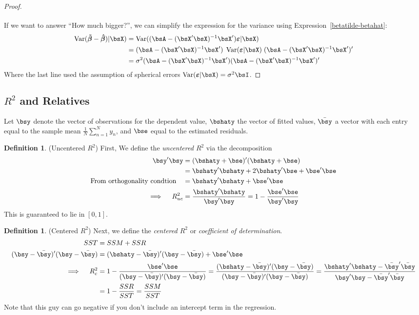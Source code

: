 \documentclass[12pt]{article}
\theoremstyle{plain}
\theoremstyle{definition}
\newtheorem{defn}[thm]{Definition}
\theoremstyle{remark}
\newcommand{\bsvarepsilon}{\boldsymbol{\varepsilon}}
\newcommand{\bshatbeta}{\boldsymbol{\hat{\beta}}}
\newcommand{\bstildebeta}{\boldsymbol{\tilde{\beta}}}
\newcommand{\Var}{\operatorname{Var}}
\newcommand{\sumnN}{\sum^N_{n=1}}
\begin{document}
\begin{proof}
\\
\\
If we want to answer ``How much bigger?'', we can simplify the
expression for the variance using Expression~\ref{betatilde-betahat}:
\begin{align*}
  \Var(\bstildebeta-\bshatbeta)|\bsX)
  &=
  \Var((\bsA-(\bsX'\bsX)^{-1}\bsX')\bsvarepsilon|\bsX) \\
  &=
  (\bsA-(\bsX'\bsX)^{-1}\bsX')
  \;\Var(\bsvarepsilon|\bsX)\;
  (\bsA-(\bsX'\bsX)^{-1}\bsX')' \\
  &=
  \sigma^2 (\bsA-(\bsX'\bsX)^{-1}\bsX')
  (\bsA-(\bsX'\bsX)^{-1}\bsX')'
\end{align*}
Where the last line used the assumption of spherical errors
$\Var(\bsvarepsilon|\bsX)=\sigma^2\bsI$.
\end{proof}


\clearpage
\subsection{$R^2$ and Relatives}

Let $\bsy$ denote the vector of observations for the dependent value,
$\bshaty$ the vector of fitted values, $\bar{\bsy}$ a vector with each
entry equal to the sample mean $\frac{1}{N}\sumnN y_n$, and $\bse$ equal
to the estimated residuals.

\begin{defn}(Uncentered $R^2$)
First, We define the \emph{uncentered $R^2$} via the decomposition
\begin{align*}
  \bsy' \bsy
  &=
  (\bshaty +\bse)'
  (\bshaty +\bse) \\
  &=
  \bshaty' \bshaty
  +2 \bshaty'\bse
  +\bse'\bse \\
  \text{From orthogonality condtion} \quad
  &=
  \bshaty' \bshaty
  +\bse'\bse \\
  \implies\quad
  R^2_{uc}
  &=
  \frac{\bshaty' \bshaty}{\bsy' \bsy}
  = 1- \frac{\bse'\bse}{\bsy' \bsy}
\end{align*}
This is guaranteed to lie in $[0,1]$.
\end{defn}

\begin{defn}(Centered $R^2$)
Next, we define the \emph{centered $R^2$} or
\emph{coefficient of determination}.
\begin{align*}
  SST &= SSM + SSR \\
  (\bsy-\bar{\bsy})'(\bsy-\bar{\bsy})
  &=
  (\bshaty-\bar{\bsy})'(\bsy-\bar{\bsy})
  +
  \bse'\bse \\
  \implies\quad
  R^2_c
  &=
  1-
  \frac{\bse'\bse}{(\bsy-\bar{\bsy})'(\bsy-\bar{\bsy})}
  =
  \frac{(\bshaty-\bar{\bsy})'(\bsy-\bar{\bsy})}{%
      (\bsy-\bar{\bsy})'(\bsy-\bar{\bsy})}
  =
  \frac{\bshaty'\bshaty - \bar{\bsy}'\bar{\bsy}}{%
      \bsy'\bsy - \bar{\bsy}'\bar{\bsy}}
  \\
  &= 1- \frac{SSR}{SST} = \frac{SSM}{SST}
\end{align*}
Note that this guy can go negative if you don't include an intercept
term in the regression.
\end{defn}
\end{document}
